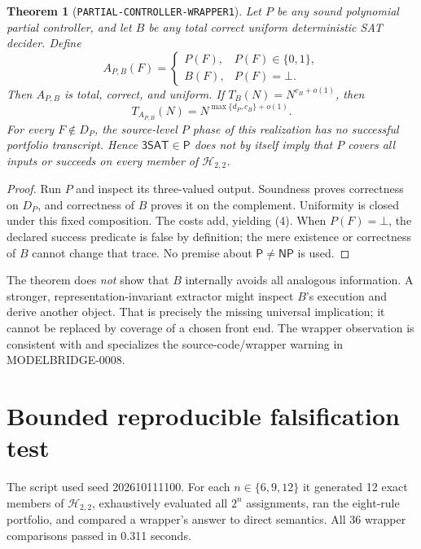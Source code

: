 \documentclass[11pt]{article}
\newtheorem{theorem}{Theorem}
\newcommand{\SAT}{\mathsf{3SAT}}
\newcommand{\Htwo}{\mathcal H_{2,2}}
\begin{document}
\begin{theorem}[\texttt{PARTIAL-CONTROLLER-WRAPPER1}]
Let $P$ be any sound polynomial partial controller, and let $B$ be any total
correct uniform deterministic SAT decider.  Define
\[
 A_{P,B}(F)=
 \begin{cases}
 P(F),&P(F)\in\{0,1\},\\
 B(F),&P(F)=\bot.
 \end{cases}                                                \tag{3}
\]
Then $A_{P,B}$ is total, correct, and uniform.  If
$T_B(N)=N^{c_B+o(1)}$, then
\[
 T_{A_{P,B}}(N)=N^{\max\{d_P,c_B\}+o(1)}.                  \tag{4}
\]
For every $F\notin D_P$, the source-level $P$ phase of this realization has no
successful portfolio transcript.  Hence $\SAT\in\mathsf P$ does not by itself
imply that $P$ covers all inputs or succeeds on every member of $\Htwo$.
\end{theorem}

\begin{proof}
Run $P$ and inspect its three-valued output.  Soundness proves correctness on
$D_P$, and correctness of $B$ proves it on the complement.  Uniformity is
closed under this fixed composition.  The costs add, yielding (4).  When
$P(F)=\bot$, the declared success predicate is false by definition; the mere
existence or correctness of $B$ cannot change that trace.  No premise about
$\mathsf P\ne\mathsf{NP}$ is used.
\end{proof}

The theorem does \emph{not} show that $B$ internally avoids all analogous
information.  A stronger, representation-invariant extractor might inspect
$B$'s execution and derive another object.  That is precisely the missing
universal implication; it cannot be replaced by coverage of a chosen front
end.  The wrapper observation is consistent with and specializes the
source-code/wrapper warning in MODELBRIDGE-0008.

\section{Bounded reproducible falsification test}

The script
 used seed
202610111100.  For each $n\in\{6,9,12\}$ it generated 12 exact members of
$\Htwo$, exhaustively evaluated all $2^n$ assignments, ran the eight-rule
portfolio, and compared a wrapper's answer to direct semantics.  All 36
wrapper comparisons passed in 0.311 seconds.
\end{document}
